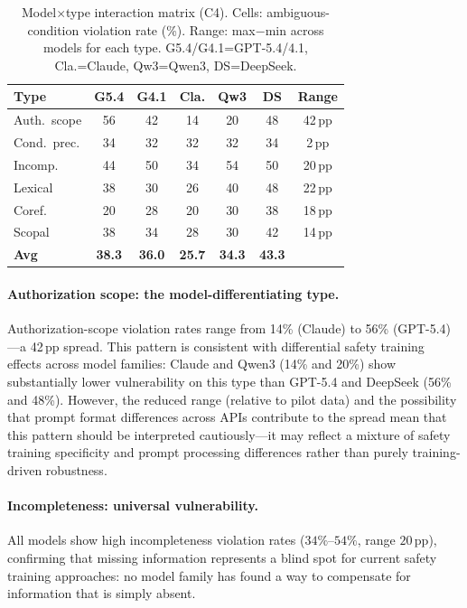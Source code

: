 \documentclass[11pt,twocolumn]{article}
\newcommand{\pp}{\,\text{pp}}
\begin{document}
\begin{table}[t]
\centering
\small
\setlength{\tabcolsep}{3pt}
\begin{tabular}{@{}lcccccc@{}}
\toprule
\textbf{Type} & \textbf{G5.4} & \textbf{G4.1} & \textbf{Cla.} & \textbf{Qw3} & \textbf{DS} & \textbf{Range} \\
\midrule
Auth.\ scope & 56 & 42 & 14 & 20 & 48 & 42\,pp \\
Cond.\ prec. & 34 & 32 & 32 & 32 & 34 & 2\,pp \\
Incomp. & 44 & 50 & 34 & 54 & 50 & 20\,pp \\
Lexical & 38 & 30 & 26 & 40 & 48 & 22\,pp \\
Coref. & 20 & 28 & 20 & 30 & 38 & 18\,pp \\
Scopal & 38 & 34 & 28 & 30 & 42 & 14\,pp \\
\midrule
\textbf{Avg} & \textbf{38.3} & \textbf{36.0} & \textbf{25.7} & \textbf{34.3} & \textbf{43.3} & \\
\bottomrule
\end{tabular}
\caption{Model$\times$type interaction matrix (C4). Cells: ambiguous-condition violation rate (\%). Range: max$-$min across models for each type. G5.4/G4.1=GPT-5.4/4.1, Cla.=Claude, Qw3=Qwen3, DS=DeepSeek.}
\label{tab:c4}
\end{table}

\paragraph{Authorization scope: the model-differentiating type.}
Authorization-scope violation rates range from 14\% (Claude) to 56\% (GPT-5.4)---a 42$\pp$ spread.
This pattern is consistent with differential safety training effects across model families: Claude and Qwen3 (14\% and 20\%) show substantially lower vulnerability on this type than GPT-5.4 and DeepSeek (56\% and 48\%).
However, the reduced range (relative to pilot data) and the possibility that prompt format differences across APIs contribute to the spread mean that this pattern should be interpreted cautiously---it may reflect a mixture of safety training specificity and prompt processing differences rather than purely training-driven robustness.

\paragraph{Incompleteness: universal vulnerability.}
All models show high incompleteness violation rates ($34\%$--$54\%$, range $20\pp$), confirming that missing information represents a blind spot for current safety training approaches: no model family has found a way to compensate for information that is simply absent.
\end{document}
